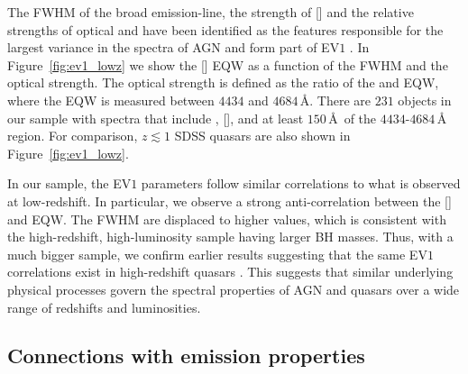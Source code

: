 The FWHM of the broad \hb emission-line, the strength of [] and the relative strengths of optical  and \hb have been identified as the features responsible for the largest variance in the spectra of AGN and form part of EV$1$ \citep{boroson92}.   
In Figure~\ref{fig:ev1_lowz} we show the [] EQW as a function of the \hb FWHM and the optical  strength. 
The optical  strength is defined as the ratio of the  and \hb EQW, where the  EQW is measured between $4434$ and $4684$\,\AA.
There are $231$ objects in our sample with spectra that include \hbns, [], and at least $150$\,\AA\, of the $4434$-$4684$\,\AA\,  region.  
For comparison, $z\lesssim1$ SDSS quasars are also shown in Figure~\ref{fig:ev1_lowz}. 
 
In our sample, the EV$1$ parameters follow similar correlations to what is observed at low-redshift.
In particular, we observe a strong anti-correlation between the [] and  EQW.  
The \hb FWHM are displaced to higher values, which is consistent with the high-redshift, high-luminosity sample having larger BH masses. 
Thus, with a much bigger sample, we confirm earlier results suggesting that the same EV$1$ correlations exist in high-redshift quasars \citep[e.g.][]{netzer04,sulentic04,sulentic06,runnoe13,shen16a}.
This suggests that similar underlying physical processes govern the spectral properties of AGN and quasars over a wide range of redshifts and luminosities. 

\subsection{Connections with  emission properties}
\label{sec:ch4-civtrends}

